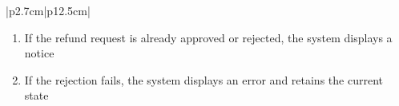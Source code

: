 \begin{table}[H]
\begin{tabular}{|p{2.7cm}|p{12.5cm}|}
\begin{minipage}[t]{\linewidth}
\begin{enumerate}[topsep=0pt,itemsep=1pt,parsep=0pt,partopsep=0pt]
                                          \item If the refund request is already approved or rejected, the system displays a
                                                notice
                                          \item If the rejection fails, the system displays an error and retains the current
                                                state
                                      \end{enumerate}
                                  \end{minipage} \\
        \hline
    \end{tabular}
    \label{tab:admin-reject-refund-request}
\end{table}
